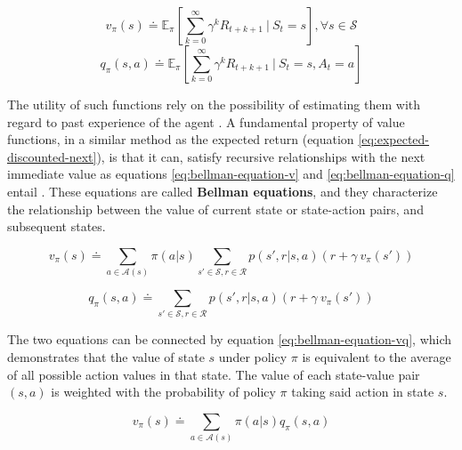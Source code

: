 \begin{equation} \label{eq:state-value-funtion}
	v_\pi(s) \doteq \mathbb{E}_\pi \left[ \sum^\infty_{k = 0} \gamma^k R_{t+k+1}\ \Bigg|\ S_t = s \right], \forall s \in \mathcal{S}
\end{equation}
\begin{equation} \label{eq:action-value-function}
	q_\pi(s,a) \doteq \mathbb{E}_\pi \left[ \sum^\infty_{k = 0} \gamma^k R_{t+k+1}\ \Bigg|\ S_t = s, A_t = a \right]    
\end{equation}

The utility of such functions rely on the possibility of estimating them with regard to past experience of the agent \cite{suttonReinforcementLearningIntroduction2014}. A fundamental property of value functions, in a similar method as the expected return (equation \ref{eq:expected-discounted-next}), is that it can, satisfy recursive relationships with the next immediate value as equations \ref{eq:bellman-equation-v}  and \ref{eq:bellman-equation-q} entail \cite{suttonReinforcementLearningIntroduction2014}. These equations are called \textbf{Bellman equations}, and they characterize the relationship between the value of current state or state-action pairs, and subsequent states. \par

\begin{equation} \label{eq:bellman-equation-v}
	v_\pi (s) \doteq \sum_{a \in \mathcal{A}(s)} \pi(a|s) \sum_{s' \in \mathcal{S}, r \in \mathcal{R}} p(s',r|s,a) (r + \gamma\ v_\pi (s'))
\end{equation}

\begin{equation} \label{eq:bellman-equation-q}
	q_\pi (s, a) \doteq \sum_{s' \in \mathcal{S}, r \in \mathcal{R}} p(s',r|s,a) (r + \gamma\ v_\pi (s'))
\end{equation}

The two equations can be connected by equation \ref{eq:bellman-equation-vq}, which demonstrates that the value of state $s$ under policy $\pi$ is equivalent to the average of all possible action values in that state. The value of each state-value pair $(s,a)$ is weighted with the probability of policy $\pi$ taking said action in state $s$.

\begin{equation} \label{eq:bellman-equation-vq}
	v_\pi (s) \doteq \sum_{a \in \mathcal{A}(s)} \pi(a|s) q_\pi (s,a)
\end{equation}




